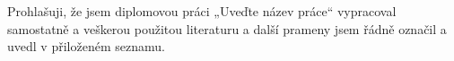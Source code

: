 
\begin{declaration}

Prohlašuji, že jsem diplomovou práci „Uveďte název práce“ vypracoval samostatně a veškerou použitou literaturu a 
další prameny jsem řádně označil a uvedl v přiloženém seznamu.


\end{declaration}

